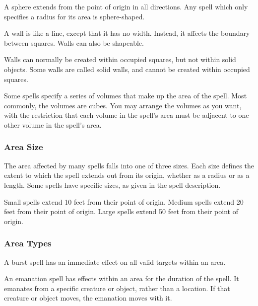              A sphere extends from the point of origin in all directions.
            Any spell which only specifies a radius for its area is sphere-shaped.

             A wall is like a line, except that it has no width.
            Instead, it affects the boundary between squares.
            Walls can also be shapeable.

            Walls can normally be created within occupied squares, but not within solid objects.
            Some walls are called solid walls, and cannot be created within occupied squares.

             Some spells specify a series of volumes that make up the area of the spell.
            Most commonly, the volumes are cubes.
            You may arrange the volumes as you want, with the restriction that each volume in the spell's area must be adjacent to one other volume in the spell's area.

        \subsubsection{Area Size}

            The area affected by many spells falls into one of three sizes.
            Each size defines the extent to which the spell extends out from its origin, whether as a radius or as a length.
            Some spells have specific sizes, as given in the spell description.

             Small spells extend 10 feet from their point of origin.
             Medium spells extend 20 feet from their point of origin.
             Large spells extend 50 feet from their point of origin.

        \subsubsection{Area Types}\label{Area Types}

             A burst spell has an immediate effect on all valid targets within an area.

             An emanation spell has effects within an area for the duration of the spell.
            It emanates from a specific creature or object, rather than a location.
            If that creature or object moves, the emanation moves with it.

